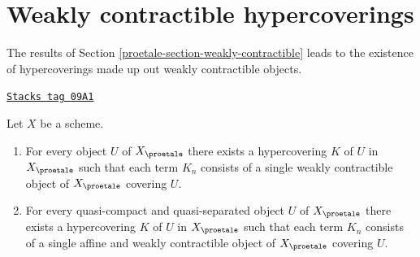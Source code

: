 \section{Weakly contractible hypercoverings}
\label{proetale-section-hypercovering}
The results of Section \ref{proetale-section-weakly-contractible}
leads to the existence of hypercoverings made up out weakly
contractible objects.

\begin{lemma}
\label{proetale-lemma-w-contractible-hypercovering}
\href{https://stacks.math.columbia.edu/tag/09A1}{\texttt{Stacks tag 09A1}}

Let $X$ be a scheme.
\begin{enumerate}
\item For every object $U$ of $X_\proetale$ there exists a hypercovering
$K$ of $U$ in $X_\proetale$ such that each term $K_n$ consists of a
single weakly contractible object of $X_\proetale$ covering $U$.
\item For every quasi-compact and quasi-separated object $U$ of $X_\proetale$
there exists a hypercovering $K$ of $U$ in $X_\proetale$ such that each
term $K_n$ consists of a single affine and weakly contractible object of
$X_\proetale$ covering $U$.
\end{enumerate}
\end{lemma}

